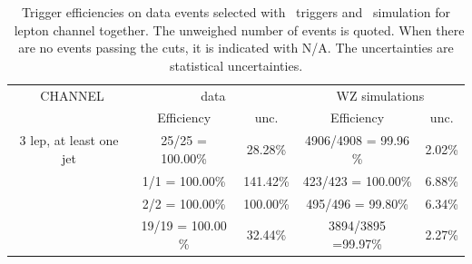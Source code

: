 \begin{table}[htbp]
	\centering
	\caption{Trigger efficiencies on data events selected with \Etmis\ triggers and \WZ\ simulation for \emumu\ lepton channel together. The unweighed number of events is quoted. When there are no events passing the cuts, it is indicated with N/A. The uncertainties are statistical uncertainties.}

	\begin{tabular}{c|c|c|c|c}
		\toprule 
		\emumu\ CHANNEL & \multicolumn{2}{c|}{data} & \multicolumn{2}{c}{WZ simulations} \\ 
		& Efficiency & unc. & Efficiency & unc. \\
		\midrule
		3 lep,  at least one jet & 25/25 = 100.00\%  & 28.28\% & 4906/4908 = 99.96 \% & 2.02\%  \\ 
		\hline 
		\STSR & 1/1 = 100.00\% &141.42\% & 423/423 = 100.00\% & 6.88\% \\ 
		\hline 
		\TTSR & 2/2 = 100.00\% & 100.00\% & 495/496 = 99.80\% & 6.34\% \\ 
		\hline 
		\WZCR & 19/19 = 100.00 \% & 32.44\% & 3894/3895 =99.97\% & 2.27\% \\ 
		\bottomrule 
	\end{tabular} 
	\label{tab:trigSF}
\end{table}
